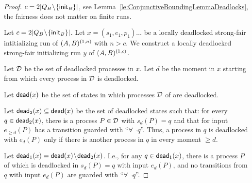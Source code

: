 \begin{proof}
\providecommand{\deadOne}{\dead_1}
\providecommand{\deadTwo}{\dead_2}

$c=2|Q_B \!\setminus\! \{{\sf init}_B\}|$, 
see Lemma~\ref{le:ConjunctiveBoundingLemmaDeadlocks}, 
the fairness does not matter on finite runs.

Let $c=2|Q_B\!\setminus\! \{ {\sf init}_B \}|$. 
Let $x= (s_1,e_1,p_1)\ldots$ be a locally deadlocked strong-fair intitializing run 
of $(A,B)^{(1,n)}$ with $n>c$. 
We construct a locally deadlocked strong-fair initializing run $y$ of $(A,B)^{(1,c)}$.

Let $\mathcal{D}$ be the set of deadlocked processes in $x$. 
Let $d$ be the moment in $x$ starting from which every process in $\mathcal{D}$ is deadlocked.

Let ${\sf dead}(x)$ be the set of states in which processes $\mathcal{D}$ of \largesys
are deadlocked.

Let $\deadTwo(x) \subseteq \dead(x)$ be the set of deadlocked states such that: 
for every $q \in \deadTwo(x)$, 
there is a process $P \in \mathcal{D}$ with $s_d(P) = q$ 
and that for input $e_{\geq d}(P)$ has a transition guarded with ``$\forall \neg q$''.
Thus, a process in $q$ is deadlocked with $e_d(P)$
only if there is another process in $q$ in every moment $\geq d$.

Let $\deadOne(x) = \dead(x)\smi\deadTwo(x)$.
I.e., 
for any $q \in \deadOne(x)$, there is a process $P$ of \largesys 
which is deadlocked in $s_d(P) = q$ with input $e_d(P)$,
and no transitions from $q$ with input $e_d(P)$ are guarded with ``$\forall \neg q$''.


\end{proof}
